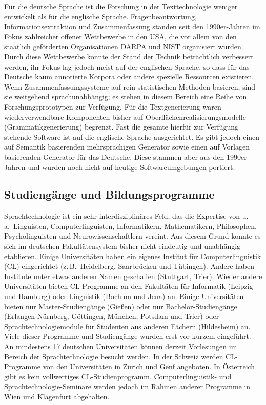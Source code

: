 \documentclass[]{../../metanetpaper}
\begin{document}
\begin{multicols}{2}
Für die deutsche Sprache ist die Forschung in der Texttechnologie weniger entwickelt als für die englische Sprache. Fragenbeantwortung, Informationsextraktion und Zusammenfassung standen seit den 1990er-Jahren im Fokus zahlreicher offener Wettbewerbe in den USA, die vor allem von den staatlich geförderten Organisationen DARPA und NIST organisiert wurden. Durch diese Wettbewerbe konnte der Stand der Technik beträchtlich verbessert werden, ihr Fokus lag jedoch meist auf der englischen Sprache, so dass für das Deutsche kaum annotierte Korpora oder andere spezielle Ressourcen existieren. Wenn Zusammenfassungssysteme auf rein statistischen Methoden basieren, sind sie weitgehend sprachunabhängig; es stehen in diesem Bereich eine Reihe von Forschungsprototypen zur Verfügung. Für die Textgenerierung waren wiederverwendbare Komponenten bisher auf Oberflächenrealisierungsmodelle (Grammatikgenerierung) begrenzt. Fast die gesamte hierfür zur Verfügung stehende Software ist auf die englische Sprache ausgerichtet. Es gibt jedoch einen auf Semantik basierenden mehrsprachigen Generator sowie einen auf Vorlagen basierenden Generator für das Deutsche. Diese stammen aber aus den 1990er-Jahren und wurden noch nicht auf heutige Softwareumgebungen portiert.

\subsection{Studiengänge und Bildungsprogramme}

Sprachtechnologie ist ein sehr interdisziplinäres Feld, das die Expertise von u.\,a.~Linguisten, Computerlinguisten, Informatikern, Mathematikern, Philosophen, Psycholinguisten und Neurowissenschaftlern vereint. Aus diesem Grund konnte es sich im deutschen Fakultätensystem bisher nicht eindeutig und unabhängig etablieren. Einige Universitäten haben ein eigenes Institut für Computerlinguistik (CL) eingerichtet (z.\,B.~Heidelberg, Saarbrücken und Tübingen). Andere haben Institute unter etwas anderen Namen geschaffen (Stuttgart, Trier). Wieder andere Universitäten bieten CL-Pro\-gram\-me an den Fakultäten für Informatik (Leipzig und Hamburg) oder Linguistik (Bochum und Jena) an. Einige Universitäten bieten nur Master-Stu\-dien\-gänge (Gießen) oder nur Bachelor-Studiengänge (Er\-langen-Nürn\-berg, Göttingen, München, Potsdam und Trier) oder Sprachtechnologiemodule für Studenten aus anderen Fächern (Hildesheim) an. Viele dieser Programme und Studiengänge wurden erst vor kurzem eingeführt. An mindestens 17 deutschen Universitäten können derzeit Vorlesungen im Bereich der Sprachtechnologie besucht werden. In der Schweiz werden CL-Pro\-gram\-me von den Universitäten in Zürich und Genf angeboten. In Österreich gibt es kein vollwertiges CL-Stu\-dien\-pro\-gramm. Com\-pu\-ter\-lingu\-istik- und Sprach\-tech\-no\-lo\-gie-Se\-mi\-nare werden jedoch im Rahmen anderer Programme in Wien und Klagenfurt abgehalten.


\end{multicols}
\end{document}
